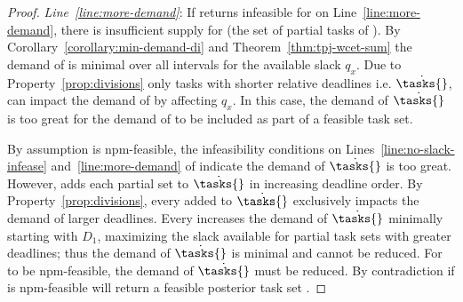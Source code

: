 \begin{theorem}
\begin{proof}
    \emph{Line~\ref{line:more-demand}}: If \tpj{} returns infeasible
    for \ants{} on Line~\ref{line:more-demand}, there is insufficient
    supply for  (the set of partial tasks of ). By
    Corollary~\ref{corollary:min-demand-di} and
    Theorem~\ref{thm:tpj-wcet-sum} the demand of  is
    minimal over all intervals for the available slack ${q_x}$. Due to
    Property~\ref{prop:divisions} only tasks with shorter relative
    deadlines i.e. ${\dot{\tasks{}}}$, can impact the demand of
     by affecting ${q_x}$. In this case, the demand of
    ${\dot{\tasks{}}}$ is too great for the demand of  to
    be included as part of a feasible task set.

    By assumption \ants{} is npm-feasible, the infeasibility
    conditions on Lines~\ref{line:no-slack-infease}
    and~\ref{line:more-demand} of \tpj{} indicate the demand of 
    ${\dot{\tasks{}}}$ is too great. However, \tpj{} adds each
    partial set  to ${\dot{\tasks{}}}$ in increasing
    deadline order. By Property~\ref{prop:divisions}, every 
     added to ${\dot{\tasks{}}}$ exclusively impacts the
    demand of larger deadlines. Every  increases the demand of
    ${\dot{\tasks{}}}$ minimally starting with ${D_1}$, maximizing the
    slack available for partial task sets with greater deadlines; thus
    the demand of ${\dot{\tasks{}}}$ is minimal and cannot be
    reduced. For \ants{} to be npm-feasible, the demand of
    ${\dot{\tasks{}}}$ must be reduced. By contradiction if \ants{} is
    npm-feasible \tpj{} will return a feasible posterior task set \tasks{}. 
  \end{proof}
\end{theorem}
